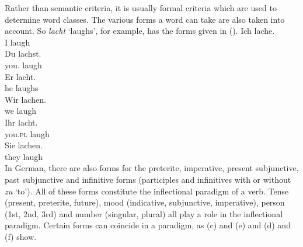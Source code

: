 Rather than semantic criteria, it is usually formal criteria which are used to determine word classes. The various forms a word can take
are also taken into account. So \emph{lacht} `laughs', for example, has the forms given in (). 
\eal
\ex 
\gll Ich lache.\\
     I laugh\\
\ex 
\gll Du lachst.\\
     you.\sg{} laugh\\
\ex 
\gll Er lacht.\\
     he laughs\\
\ex 
\gll Wir lachen.\\
     we laugh\\
\ex 
\gll Ihr lacht.\\
     you.\textsc{pl} laugh\\
\ex 
\gll Sie lachen.\\
     they laugh\\
\zl
In German, there are also forms for the preterite, imperative, present subjunctive, past subjunctive and infinitive forms 
(participles and infinitives with or without \emph{zu} `to'). All of these forms constitute the
inflectional paradigm of a verb. Tense  (present,
preterite, future),
mood (indicative, subjunctive, imperative),
person (1st, 2nd, 3rd) and number (singular, plural) all play a role in the
inflectional paradigm. Certain forms can coincide in a paradigm, as (c) and (e) and
(d) and (f) show.

